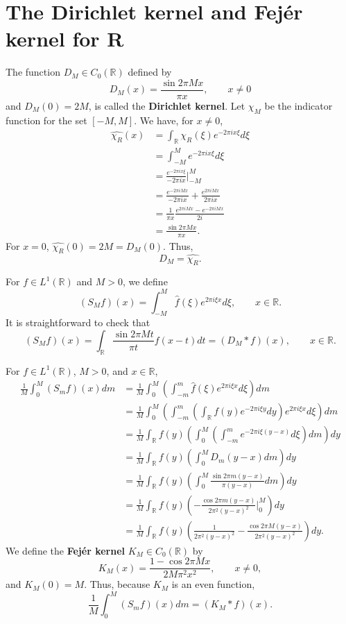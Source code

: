 \documentclass{article}
\theoremstyle{definition}
\begin{document}
\section{The Dirichlet kernel and Fej\'er kernel for \textbf{R}}
The function $D_M \in C_0(\mathbb{R})$ defined by
\[
D_M(x)=\frac{\sin 2\pi Mx}{\pi x}, \qquad x \neq 0
\]
and $D_M(0)=2M$, is called the \textbf{Dirichlet kernel}.
Let $\chi_M$ be the indicator function for the set $[-M,M]$. We have, for $x \neq 0$,
\begin{align*}
\widehat{\chi_R}(x)& = \int_{\mathbb{R}} \chi_R(\xi) e^{-2\pi ix\xi} d\xi\\
&=\int_{-M}^M e^{-2\pi ix\xi} d\xi\\
&=\frac{e^{-2\pi ix\xi}}{-2\pi ix} \bigg|_{-M}^M\\
&=\frac{e^{-2\pi iMx}}{-2\pi ix} + \frac{e^{2\pi iMx}}{2\pi ix}\\
&=\frac{1}{\pi x} \frac{e^{2\pi iMx}-e^{-2\pi iMx}}{2i}\\
&=\frac{\sin 2\pi Mx}{\pi x}.
\end{align*}
For $x=0$, $\widehat{\chi_R}(0)=2M=D_M(0)$. Thus,
\[
D_M=\widehat{\chi_R}.
\]

For $f \in L^1(\mathbb{R})$ and $M>0$, we define
\[
(S_M f)(x) = \int_{-M}^M \hat{f}(\xi) e^{2\pi i\xi x} d\xi, \qquad x \in \mathbb{R}.
\]
It is straightforward to check that
\[
(S_M f)(x) = \int_{\mathbb{R}} \frac{\sin 2\pi Mt}{\pi t} f(x-t) dt
=(D_M*f)(x), \qquad x \in \mathbb{R}.
\]


For $f \in L^1(\mathbb{R})$, $M>0$, and $x \in \mathbb{R}$,
\begin{align*}
\frac{1}{M} \int_0^M (S_mf)(x) dm&=\frac{1}{M} \int_0^M \left( \int_{-m}^m \hat{f}(\xi) e^{2\pi i\xi x} d\xi \right) dm\\
&=\frac{1}{M}  \int_0^M \left( \int_{-m}^m \left( \int_{\mathbb{R}} f(y) e^{-2\pi i\xi y} dy \right) e^{2\pi i\xi x} d\xi \right) dm\\
&=\frac{1}{M} \int_{\mathbb{R}} f(y) \left( \int_0^M \left( \int_{-m}^m e^{-2\pi i\xi(y-x)} d\xi\right) dm \right) dy\\
&=\frac{1}{M} \int_{\mathbb{R}} f(y) \left( \int_0^M D_m(y-x) dm \right) dy\\
&=\frac{1}{M} \int_{\mathbb{R}} f(y)  \left( \int_0^M \frac{\sin 2\pi m(y-x)}{\pi(y-x)} dm \right) dy\\
&=\frac{1}{M} \int_{\mathbb{R}} f(y) \left( -\frac{\cos 2\pi m(y-x)}{2\pi^2 (y-x)^2} \bigg|_{0}^M \right) dy\\
&=\frac{1}{M} \int_{\mathbb{R}} f(y) \left(\frac{1}{2\pi^2(y-x)^2} - \frac{\cos 2\pi M(y-x)}{2\pi^2(y-x)^2} \right) dy.
\end{align*}
We define the \textbf{Fej\'er kernel} $K_M \in C_0(\mathbb{R})$ by
\[
K_M(x) = \frac{1-\cos 2\pi M x}{2M \pi^2 x^2}, \qquad x \neq 0,
\]
and $K_M(0)=M$. Thus, because $K_M$ is an even function,
\[
\frac{1}{M} \int_0^M (S_m f)(x) dm = (K_M*f)(x).
\]
\end{document}
